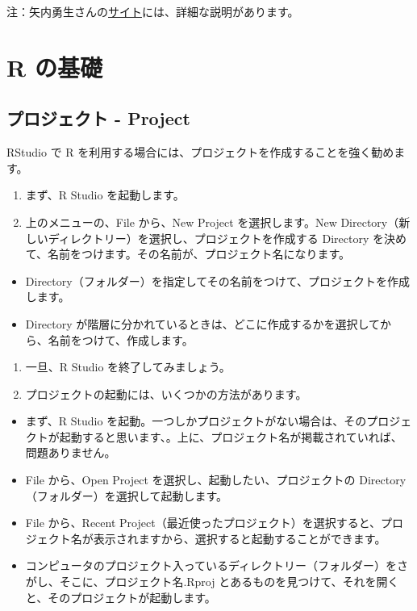 \documentclass[
  xelatex, ja=standard]{bxjsbook}
\providecommand{\tightlist}{%
  \setlength{\itemsep}{0pt}\setlength{\parskip}{0pt}}
\theoremstyle{definition}
\theoremstyle{definition}
\theoremstyle{definition}
\theoremstyle{definition}
\theoremstyle{remark}
\begin{document}
注：矢内勇生さんの\href{https://yukiyanai.github.io/jp/resources/docs/install-R_windows.pdf}{サイト}には、詳細な説明があります。

\hypertarget{rbasics}{%
\chapter{R の基礎}\label{rbasics}}

\hypertarget{ux30d7ux30edux30b8ux30a7ux30afux30c8---project}{%
\section{プロジェクト - Project}\label{ux30d7ux30edux30b8ux30a7ux30afux30c8---project}}

RStudio で R を利用する場合には、プロジェクトを作成することを強く勧めます。

\begin{enumerate}
\def\labelenumi{\arabic{enumi}.}
\item
  まず、R Studio を起動します。
\item
  上のメニューの、File から、New Project を選択します。New Directory（新しいディレクトリー）を選択し、プロジェクトを作成する Directory を決めて、名前をつけます。その名前が、プロジェクト名になります。
\end{enumerate}

\begin{itemize}
\tightlist
\item
  Directory（フォルダー）を指定してその名前をつけて、プロジェクトを作成します。
\item
  Directory が階層に分かれているときは、どこに作成するかを選択してから、名前をつけて、作成します。
\end{itemize}

\begin{enumerate}
\def\labelenumi{\arabic{enumi}.}
\setcounter{enumi}{2}
\item
  一旦、R Studio を終了してみましょう。
\item
  プロジェクトの起動には、いくつかの方法があります。
\end{enumerate}

\begin{itemize}
\tightlist
\item
  まず、R Studio を起動。一つしかプロジェクトがない場合は、そのプロジェクトが起動すると思います、。上に、プロジェクト名が掲載されていれば、問題ありません。
\item
  File から、Open Project を選択し、起動したい、プロジェクトの Directory（フォルダー）を選択して起動します。
\item
  File から、Recent Project（最近使ったプロジェクト）を選択すると、プロジェクト名が表示されますから、選択すると起動することができます。
\item
  コンピュータのプロジェクト入っているディレクトリー（フォルダー）をさがし、そこに、プロジェクト名.Rproj とあるものを見つけて、それを開くと、そのプロジェクトが起動します。
\end{itemize}
\end{document}
